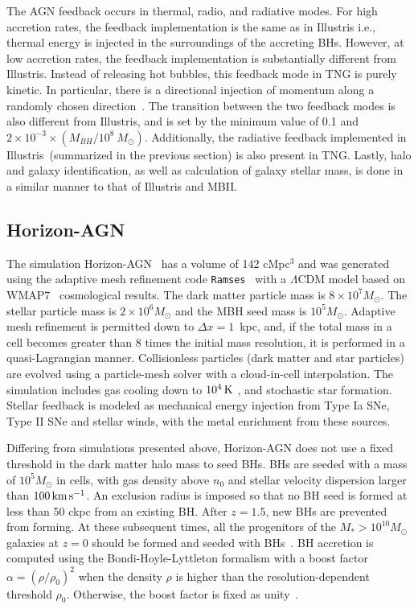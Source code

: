 \documentclass[twocolumn]{aastex631}
\def\smass{{$M_*$}}
\begin{document}
The AGN feedback occurs in thermal, radio, and radiative modes. For high accretion rates, the feedback implementation is the same as in Illustris i.e., thermal energy is injected in the surroundings of the accreting BHs. However, at low accretion rates, the feedback implementation is substantially different from Illustris. Instead of releasing hot bubbles, this feedback mode in TNG is purely kinetic. In particular, there is a directional injection of momentum along a randomly chosen direction~\citep{2017MNRAS.465.3291W, 2018MNRAS.479.4056W}. %
The transition between the two feedback modes is also different from Illustris, and is set by the minimum value of 0.1 and $2 \times 10 ^{-3} \times (M_{BH} / 10^8~M_{\odot})$. Additionally, the radiative feedback implemented in Illustris~(summarized in the previous section) is also present in TNG. Lastly, halo and galaxy identification, as well as calculation of galaxy stellar mass, is done in a similar manner to that of Illustris and MBII.

\subsection{Horizon-AGN}\label{subsec:Horizon}
The simulation Horizon-AGN~\citep{2014MNRAS.444.1453D, 2016MNRAS.463.3948D} has a volume of 142 cMpc$^3$ and was generated using the adaptive mesh refinement code {\tt Ramses}~\citep{2002A&A...385..337T} with a $\Lambda$CDM model based on WMAP7~\citep{2011ApJS..192...18K} cosmological results. The dark matter particle mass is $8\times 10^7 M_{\odot}$. The stellar particle mass is $2\times 10^6 M_{\odot}$ and the MBH seed mass is $10^5 M_{\odot}$. Adaptive mesh refinement is permitted down to $\Delta x=1$~kpc, and, if the total mass in a cell becomes greater than 8 times the initial mass resolution, it is performed in a quasi-Lagrangian manner. Collisionless particles (dark matter and star particles) are evolved using a particle-mesh solver with a cloud-in-cell interpolation.
The simulation includes gas cooling down to $10^4\, \rm K$ \citep{sutherland&dopita93}, and stochastic star formation. Stellar feedback is modeled as mechanical energy injection from Type Ia SNe, Type II SNe and stellar winds, with the metal enrichment from these sources.

Differing from simulations presented above, Horizon-AGN does not use a fixed threshold in the dark matter halo mass to seed BHs.  BHs are seeded with a mass of $10^5 M_\odot$ in cells, with gas density above $n_0$ and stellar velocity dispersion larger than $100 \,\rm km\,s^{-1}$. An exclusion radius is imposed so that no BH seed is formed at less than 50 ckpc from an existing BH. After $z = 1.5$, new BHs are prevented from forming. At these subsequent times, all the progenitors of the \smass$>10^{10} M_{\odot}$ galaxies at $z = 0$ should be formed and seeded with BHs~\citep{2016MNRAS.460.2979V}.  BH accretion is computed using the Bondi-Hoyle-Lyttleton formalism with a boost factor $\alpha = (\rho/\rho_0)^2$ when the density $\rho$ is higher than the resolution-dependent threshold $\rho_0$. Otherwise, the boost factor is fixed as unity~\citep{2009MNRAS.398...53B}.
\end{document}

